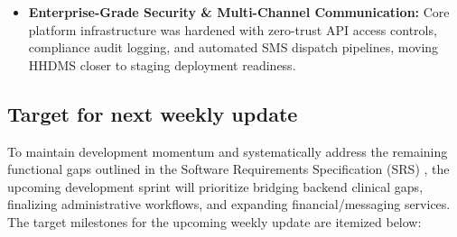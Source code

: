 \documentclass[onecolumn,journal]{IEEEtran}
\begin{document}
\begin{itemize}
\begin{itemize}
			\item \textbf{Enterprise-Grade Security \& Multi-Channel Communication:} Core platform infrastructure was hardened with zero-trust API access controls, compliance audit logging, and automated SMS dispatch pipelines, moving HHDMS closer to staging deployment readiness.
		\end{itemize}
	\end{itemize}
	
	\subsection{Target for next weekly update}
	To maintain development momentum and systematically address the remaining functional gaps outlined in the Software Requirements Specification (SRS) \cite{srs2026}, the upcoming development sprint will prioritize bridging backend clinical gaps, finalizing administrative workflows, and expanding financial/messaging services. The target milestones for the upcoming weekly update are itemized below:
	
\end{document}
